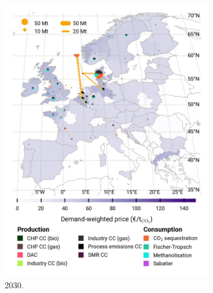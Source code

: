 \documentclass[preprint,12pt,sort&compress]{elsarticle}
\begin{document}
\begin{figure}[htbp]
\begin{subfigure}[t]{0.33\textwidth}
      \includegraphics[width=1\textwidth]{maps/pcipmi/base_s_adm___2030-balance_map_co2_stored} 
      \caption{ 2030.}
      \label{fig:PCI_lt_2030_co2}
  \end{subfigure}
  \begin{subfigure}[t]{0.33\textwidth}
      \vspace{0pt}

\end{subfigure}
\end{figure}
\end{document}
